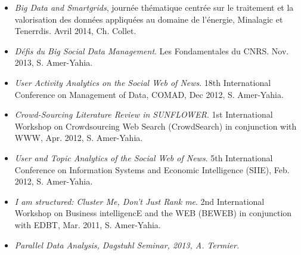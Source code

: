 \begin{itemize}

\item \emph{ Big Data and Smartgrids}, journ{\'e}e th{\'e}matique centr{\'e}e sur le traitement et la valorisation des donn{\'e}es appliqu{\'e}es au domaine de l'{\'e}nergie, Minalagic et Tenerrdis. Avril 2014, Ch. Collet.

\item \emph{D\'efis du Big Social Data Management}. Les Fondamentales du CNRS. Nov. 2013, S. Amer-Yahia.

\item \emph{User Activity Analytics on the Social Web of News}. 18th International Conference on Management of Data, COMAD, Dec 2012, S. Amer-Yahia.

\item \emph{Crowd-Sourcing Literature Review in SUNFLOWER}. 1st International Workshop on Crowdsourcing Web Search (CrowdSearch) in conjunction with WWW, Apr. 2012, S. Amer-Yahia.

\item \emph{User and Topic Analytics of the Social Web of News}. 5th International Conference on Information Systems and Economic
  Intelligence (SIIE), Feb. 2012, S. Amer-Yahia.
  
\item \emph{I am structured: Cluster Me, Don't Just Rank me}. 2nd International Workshop on Business  intelligencE and the WEB (BEWEB) in conjunction with EDBT, Mar. 2011, S. Amer-Yahia.

\item \em{Parallel Data Analysis}, Dagstuhl Seminar, 2013, A. Termier.






\end{itemize}
